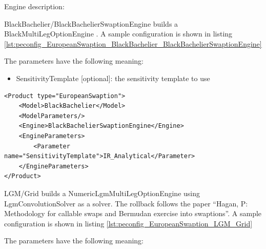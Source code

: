 Engine description:

BlackBachelier/BlackBachelierSwaptionEngine builds a BlackMultiLegOptionEngine . A sample configuration is shown in
listing \ref{lst:peconfig_EuropeanSwaption_BlackBachelier_BlackBachelierSwaptionEngine}

The parameters have the following meaning:

\begin{itemize}
\item SensitivityTemplate [optional]: the sensitivity template to use
\end{itemize}

\begin{longlisting}
\begin{verbatim}
<Product type="EuropeanSwaption">
    <Model>BlackBachelier</Model>
    <ModelParameters/>
    <Engine>BlackBachelierSwaptionEngine</Engine>
    <EngineParameters>
        <Parameter name="SensitivityTemplate">IR_Analytical</Parameter>
    </EngineParameters>
</Product>
\end{verbatim}
\caption{Configuration for Product EuropeanSwaption, Model BlackBachelier, Engine BlackBachelierSwaptionEngine}
\label{lst:peconfig_EuropeanSwaption_BlackBachelier_BlackBachelierSwaptionEngine}
\end{longlisting}

LGM/Grid builds a NumericLgmMultiLegOptionEngine using LgmConvolutionSolver as a solver. The rollback follows the paper
``Hagan, P: Methodology for callable swaps and Bermudan exercise into swaptions''. A sample configuration is shown in
listing \ref{lst:peconfig_EuropeanSwaption_LGM_Grid}

The parameters have the following meaning:

